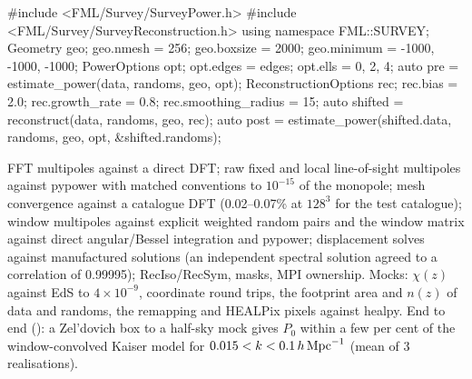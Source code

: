 \begin{cppcode}
#include <FML/Survey/SurveyPower.h>
#include <FML/Survey/SurveyReconstruction.h>
using namespace FML::SURVEY;
Geometry geo;  geo.nmesh = 256;  geo.boxsize = 2000;  geo.minimum = {-1000, -1000, -1000};
PowerOptions opt;  opt.edges = edges;  opt.ells = {0, 2, 4};
auto pre = estimate_power(data, randoms, geo, opt);
ReconstructionOptions rec;  rec.bias = 2.0;  rec.growth_rate = 0.8;  rec.smoothing_radius = 15;
auto shifted = reconstruct(data, randoms, geo, rec);
auto post = estimate_power(shifted.data, randoms, geo, opt, &shifted.randoms);
\end{cppcode}

\begin{validation}
FFT multipoles against a direct DFT; raw fixed and local line-of-sight multipoles against pypower with matched conventions to $10^{-15}$ of the monopole; mesh
convergence against a catalogue DFT (0.02--0.07\% at $128^3$ for the test catalogue); window multipoles against explicit weighted random pairs and the window
matrix against direct angular/Bessel integration and pypower; displacement solves against manufactured solutions (an independent spectral solution agreed to a
correlation of 0.99995); RecIso/RecSym, masks, MPI ownership. Mocks: $\chi(z)$ against EdS to $4\times10^{-9}$, coordinate round trips, the footprint area and
$n(z)$ of data and randoms, the remapping and HEALPix pixels against healpy. End to end (): a Zel'dovich box to a half-sky mock gives
$P_0$ within a few per cent of the window-convolved Kaiser model for $0.015<k<0.1\,h\,\mathrm{Mpc}^{-1}$ (mean of 3 realisations).
\end{validation}
